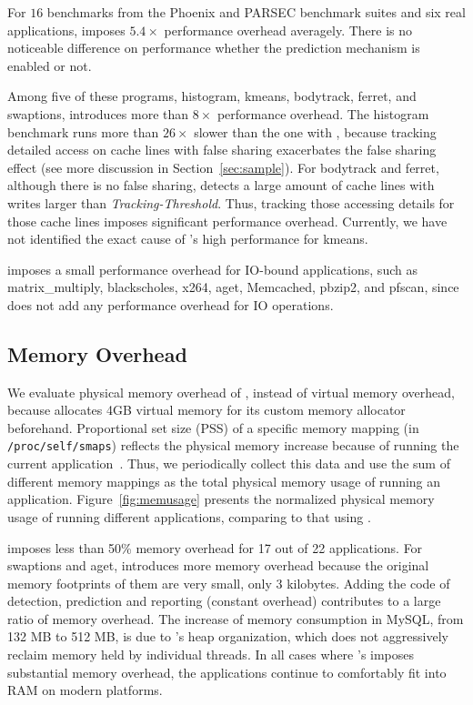 For $16$ benchmarks from the Phoenix and PARSEC benchmark suites and six real applications, \Predator{} imposes $5.4\times$ performance overhead averagely. There is no noticeable difference on performance whether the prediction mechanism is enabled or not. 
 
Among five of these programs, histogram, kmeans, bodytrack, ferret, and swaptions, \predator{} introduces more than $8\times$ performance overhead. The histogram benchmark runs more than $26\times$ slower than the one with \pthreads{}, because tracking detailed access on cache lines with false sharing exacerbates the false sharing effect (see more discussion in Section~\ref{sec:sample}).  For bodytrack and ferret, although there is no false sharing, \Predator{} detects a large amount of cache lines with writes larger than {\it Tracking-Threshold}. Thus, tracking those accessing details for those cache lines imposes significant performance overhead. Currently, we have not identified the exact cause of \Predator{}'s high performance for kmeans.
   
\Predator{} imposes a small performance overhead for IO-bound applications, such as matrix\_multiply, blackscholes, x264, aget, Memcached, pbzip2, and pfscan, since \Predator{} does not add any performance overhead for IO operations.  

\subsection{Memory Overhead}
\label{sec:memoverhead}
We evaluate physical memory overhead of \Predator{}, instead of virtual memory overhead, because \Predator{} allocates 4GB virtual memory for its custom memory allocator beforehand. Proportional set size (PSS) of a specific memory mapping (in \texttt{/proc/self/smaps}) reflects the physical memory increase because of running the current application~\cite{memusage}. Thus, we periodically collect this data and use the sum of different memory mappings as the total physical memory usage of running an application. Figure~\ref{fig:memusage} presents the normalized physical memory usage of running different applications, comparing to that using \pthreads{}. 

\Predator{} imposes less than 50\% memory overhead for 17 out of 22 applications.  For swaptions and aget, \Predator{} introduces more memory overhead because the original memory footprints of them are very small, only $3$ kilobytes. Adding the code of detection, prediction and reporting (constant overhead) contributes to a large ratio of memory overhead. The increase of memory consumption in MySQL, from 132 MB to 512 MB, is due to \Predator{}'s heap organization, which does not aggressively reclaim memory held by individual threads. In all cases where \Predator{}'s imposes substantial memory overhead, the applications continue to comfortably fit into RAM on modern platforms.


